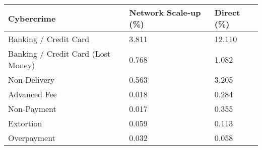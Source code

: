 \captionsetup[table]{labelformat=empty,skip=1pt}
\begin{longtable}{lll}
\toprule
Cybercrime & Network Scale-up (\%) & Direct (\%) \\ 
\midrule
Banking / Credit Card & 3.811 & 12.110 \\ 
Banking / Credit Card (Lost Money) & 0.768 & 1.082 \\ 
Non-Delivery & 0.563 & 3.205 \\ 
Advanced Fee & 0.018 & 0.284 \\ 
Non-Payment & 0.017 & 0.355 \\ 
Extortion & 0.059 & 0.113 \\ 
Overpayment & 0.032 & 0.058 \\ 
\bottomrule
\end{longtable}

